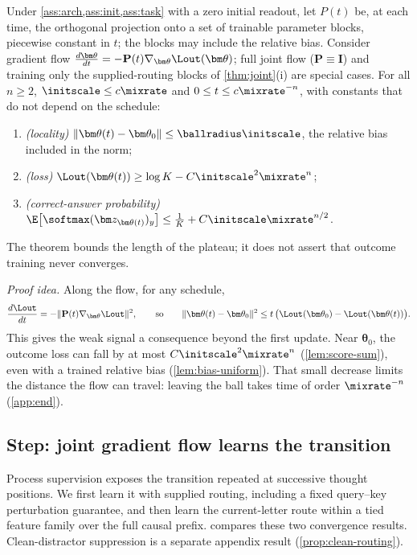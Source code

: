\begin{theorem}
\label{thm:outcome-end}
Under \cref{ass:arch,ass:init,ass:task} with a zero initial readout, let $P(t)$ be, at each time, the orthogonal projection onto a set
of trainable parameter blocks, piecewise constant in $t$; the blocks may include the relative bias. Consider gradient flow
$\tfrac{d\bm\theta}{dt}=-\mathbf P(t)\nabla_{\bm\theta}\Lout(\bm\theta)$; full joint flow ($\mathbf P\equiv\mathbf I$) and training only the supplied-routing blocks of \cref{thm:joint}(i) are special cases.
For all $n\ge2$, $\initscale\le c\mixrate$ and $0\le t\le c\mixrate^{-n}$, with constants that do not depend on the schedule:
\begin{enumerate}[label=(\roman*),leftmargin=*,itemsep=0pt,topsep=2pt]
\item \emph{(locality)} $\|\bm\theta(t)-\bm\theta_0\|\le\ballradius\initscale$, the relative bias included in the norm;
\item \emph{(loss)} $\Lout(\bm\theta(t))\ge\log K-C\initscale^2\mixrate^n$;
\item \emph{(correct-answer probability)} $\E\bigl[\softmax(\bm z_{\bm\theta(t)})_y\bigr]\le\frac{1}{K}+C\initscale\mixrate^{n/2}$.
\end{enumerate}
\end{theorem}
The theorem bounds the length of the plateau; it does not assert that outcome training never converges.

\emph{Proof idea.} Along the flow, for any schedule,
\[
 \frac{d\Lout}{dt}=-\|\mathbf P(t)\nabla_{\bm\theta}\Lout\|^2,
 \qquad\text{so}\qquad
 \|\bm\theta(t)-\bm\theta_0\|^2\le t\,\bigl(\Lout(\bm\theta_0)-\Lout(\bm\theta(t))\bigr).
\]
This gives the weak signal a consequence beyond the first update. Near $\bm\theta_0$, the outcome loss can fall by at most
$C\initscale^2\mixrate^n$ (\cref{lem:score-sum}), even with a trained relative bias (\cref{lem:bias-uniform}). That small decrease limits
the distance the flow can travel: leaving the ball takes time of order $\mixrate^{-n}$ (\cref{app:end}).

\subsection{Step: joint gradient flow learns the transition}
\label{sec:step}
Process supervision exposes the transition repeated at successive thought
positions. We first learn it with supplied routing, including a fixed
query--key perturbation guarantee, and then learn the current-letter route
within a tied feature family over the full causal prefix.
 compares these two convergence results.
Clean-distractor suppression is a separate appendix result
(\cref{prop:clean-routing}).


